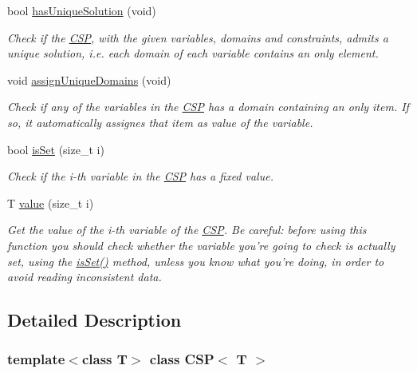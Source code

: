 \begin{DoxyCompactItemize}
bool \hyperlink{classCSP_ae96286c6c7dfb6fe077544e0d4af15f4}{hasUniqueSolution} (void)
\begin{DoxyCompactList}\small\item\em Check if the \hyperlink{classCSP}{CSP}, with the given variables, domains and constraints, admits a unique solution, i.e. each domain of each variable contains an only element. \item\end{DoxyCompactList}\item 
\hypertarget{classCSP_ac74cb751589a58bf6f2815f6878d2213}{
void \hyperlink{classCSP_ac74cb751589a58bf6f2815f6878d2213}{assignUniqueDomains} (void)}
\label{classCSP_ac74cb751589a58bf6f2815f6878d2213}

\begin{DoxyCompactList}\small\item\em Check if any of the variables in the \hyperlink{classCSP}{CSP} has a domain containing an only item. If so, it automatically assignes that item as value of the variable. \item\end{DoxyCompactList}\item 
bool \hyperlink{classCSP_a213dafc1aae7b1825371810a511eca4f}{isSet} (size\_\-t i)
\begin{DoxyCompactList}\small\item\em Check if the i-\/th variable in the \hyperlink{classCSP}{CSP} has a fixed value. \item\end{DoxyCompactList}\item 
T \hyperlink{classCSP_aafa5e1a65d6c5d80780437d8d684f32a}{value} (size\_\-t i)
\begin{DoxyCompactList}\small\item\em Get the value of the i-\/th variable of the \hyperlink{classCSP}{CSP}. Be careful: before using this function you should check whether the variable you're going to check is actually set, using the \hyperlink{classCSP_a213dafc1aae7b1825371810a511eca4f}{isSet()} method, unless you know what you're doing, in order to avoid reading inconsistent data. \item\end{DoxyCompactList}\end{DoxyCompactItemize}


\subsection{Detailed Description}
\subsubsection*{template$<$class T$>$ class CSP$<$ T $>$}

